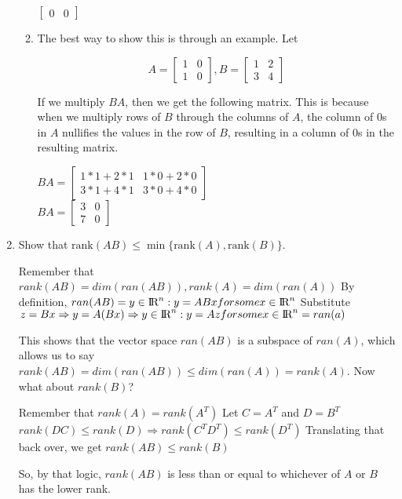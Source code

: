 \documentclass{article}
\newcommand{\IR}{{\rm\hbox{I\kern-.15em R}}}
\begin{document}
\begin{enumerate}
\begin{enumerate}
\begin{center}
                $\begin{bmatrix}0 & 0 \end{bmatrix}$\\
            \end{center}
            \item The best way to show this is through an example. Let
            \begin{center}
                $$ 
                A = \begin{bmatrix} 1 & 0\\ 1 & 0 \end{bmatrix},
                B = \begin{bmatrix} 1 & 2 \\ 3 & 4 \end{bmatrix}
                $$
            \end{center}
            If we multiply $BA$, then we get the following matrix. This is because when we multiply rows of $B$ through the
            columns of $A$, the column of 0s in $A$ nullifies the values in the row of $B$, resulting in a column of 0s in 
            the resulting matrix.
            \begin{center}
                $BA = \begin{bmatrix} 1*1 + 2*1 & 1*0  + 2*0 \\ 3*1 + 4*1 & 3*0  + 4*0 \end{bmatrix}$\\
                $BA = \begin{bmatrix} 3 & 0 \\ 7 & 0 \end{bmatrix}$\\
            \end{center}
        \end{enumerate}
        \item Show that $\mbox{rank}(AB) \leq \min\{\mbox{rank}(A), \mbox{rank}(B)\}$.
        \begin{center}
            Remember that $rank(AB) = dim(ran(AB)), rank(A) = dim(ran(A))$
            By definition, $ran(AB) = {y \in \IR^n : y = ABx for some x \in \IR^n}$
            Substitute $z = Bx \Rightarrow y = A(Bx) \Rightarrow {y \in \IR^n : y = Az for some x \in \IR^n} = ran(a)$
        \end{center}
        This shows that the vector space $ran(AB)$ is a subspace of $ran(A)$, which allows us to say 
        $rank(AB) = dim(ran(AB)) \leq dim(ran(A)) = rank(A)$. Now what about $rank(B)$? 
        \begin{center}
            Remember that $rank(A) = rank(A^T)$
            Let $C = A^T$ and $D = B^T$
            $rank(DC) \leq rank(D) \Rightarrow rank(C^TD^T) \leq rank(D^T)$
            Translating that back over, we get $rank(AB) \leq rank(B)$
        \end{center}
        So, by that logic, $rank(AB)$ is less than or equal to whichever of $A$ or $B$ has the lower
        rank.
    \end{enumerate}
\end{document}
